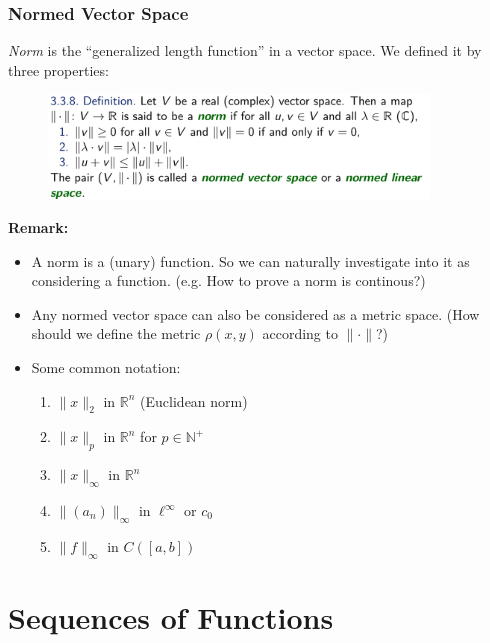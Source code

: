 \documentclass[10pt, t]{beamer}
\renewcommand{\emph}[1]{{\color{themecolor}\textsl{#1}}}
\newcommand{\N}{\mathbb{N}}
\newcommand{\R}{\mathbb{R}}
\begin{document}
\begin{frame}[allowframebreaks]
    \frametitle{Normed Vector Space}

    \emph{Norm} is the ``generalized length function'' in a vector space. We defined it by three properties: 
    \begin{figure}[H]
        \centering
        \includegraphics[width=0.9\textwidth]{2020-11-17-20-13-44.png}
    \end{figure}
    \textbf{Remark:}\begin{itemize}
        \item A norm is a (unary) function. So we can naturally investigate into it as considering a function. (e.g. How to prove a norm is continous?)
        \item Any normed vector space can also be considered as a metric space. (How should we define the metric $\rho(x,y)$ according to $\|\cdot\|$?)
        \item Some common notation:\begin{enumerate}
            \item $\|x\|_2$ in $\R^n$ (Euclidean norm)
            \item $\|x\|_p$ in $\R^n$ for $p\in\N^+$
            \item $\|x\|_\infty$ in $\R^n$
            \item $\|(a_n)\|_\infty$ in $\ell^\infty$ or $c_0$
            \item $\|f\|_\infty$ in $C([a,b])$
        \end{enumerate}
    \end{itemize}
\end{frame}

\section{Sequences of Functions}
\end{document}
